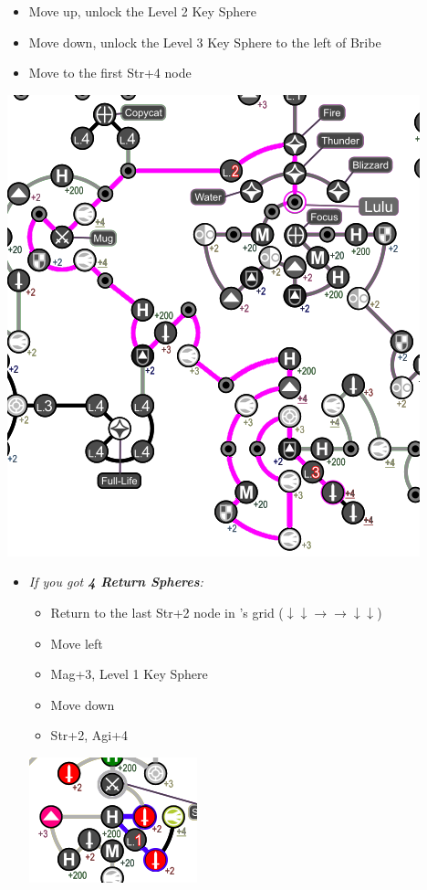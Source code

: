 \begin{spheregrid}
\begin{multicols}{2}
\begin{itemize}
	\luluf 
	\begin{itemize}
		\item Move up, unlock the Level 2 Key Sphere
		\item Move down, unlock the Level 3 Key Sphere to the left of Bribe
		\item Move to the first Str+4 node
	\end{itemize}
	\includegraphics[width=.75\columnwidth]{graphics/lulu_grid}
	\yunaf
	\begin{itemize}
		\item \textit{If you got \textbf{4 Return Spheres}:}
		\begin{itemize}
			\item Return to the last Str+2 node in \wakka's grid ($\downarrow \downarrow \rightarrow \rightarrow \downarrow \downarrow$)
			\item Move left
			\item Mag+3, Level 1 Key Sphere
			\item Move down
			\item Str+2, Agi+4
		\end{itemize}
		\includegraphics[width=.5\columnwidth]{graphics/4_returns}

\end{itemize}
\end{itemize}
\end{multicols}
\end{spheregrid}
